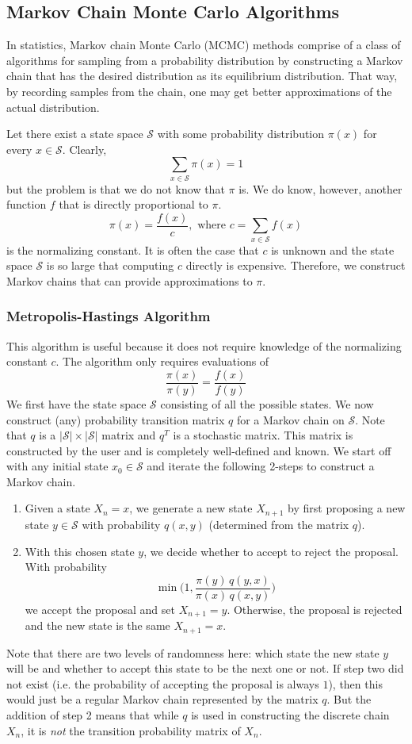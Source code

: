 \documentclass{article}
\theoremstyle{remark}
\theoremstyle{definition}
\begin{document}
\subsection{Markov Chain Monte Carlo Algorithms}
In statistics, Markov chain Monte Carlo (MCMC) methods comprise of a class of algorithms for sampling from a probability distribution by constructing a Markov chain that has the desired distribution as its equilibrium distribution. That way, by recording samples from the chain, one may get better approximations of the actual distribution. 

Let there exist a state space $\mathcal{S}$ with some probability distribution $\pi(x)$ for every $x \in \mathcal{S}$. Clearly, 
\[\sum_{x \in \mathcal{S}} \pi(x) = 1\]
but the problem is that we do not know that $\pi$ is. We do know, however, another function $f$ that is directly proportional to $\pi$. 
\[\pi(x) = \frac{f(x)}{c}, \text{ where } c = \sum_{x \in \mathcal{S}} f(x)\]
is the normalizing constant. It is often the case that $c$ is unknown and the state space $\mathcal{S}$ is so large that computing $c$ directly is expensive. Therefore, we construct Markov chains that can provide approximations to $\pi$. 

\subsubsection{Metropolis-Hastings Algorithm}
This algorithm is useful because it does not require knowledge of the normalizing constant $c$. The algorithm only requires evaluations of 
\[\frac{\pi(x)}{\pi(y)} = \frac{f(x)}{f(y)}\]
We first have the state space $\mathcal{S}$ consisting of all the possible states. We now construct (any) probability transition matrix $q$ for a Markov chain on $\mathcal{S}$. Note that $q$ is a $|\mathcal{S}| \times |\mathcal{S}|$ matrix and $q^T$ is a stochastic matrix. This matrix is constructed by the user and is completely well-defined and known. We start off with any initial state $x_0 \in \mathcal{S}$ and iterate the following 2-steps to construct a Markov chain. 
\begin{enumerate}
    \item Given a state $X_n = x$, we generate a new state $X_{n+1}$ by first proposing a new state $y \in \mathcal{S}$ with probability $q(x, y)$ (determined from the matrix $q$). 
    \item With this chosen state $y$, we decide whether to accept to reject the proposal. With probability 
    \[\min \bigg( 1, \frac{\pi(y) \,  q(y, x)}{\pi(x) \, q(x, y)} \bigg)\]
    we accept the proposal and set $X_{n+1} = y$. Otherwise, the proposal is rejected and the new state is the same $X_{n+1} = x$. 
\end{enumerate}
Note that there are two levels of randomness here: which state the new state $y$ will be and whether to accept this state to be the next one or not. If step two did not exist (i.e. the probability of accepting the proposal is always $1$), then this would just be a regular Markov chain represented by the matrix $q$. But the addition of step 2 means that while $q$ is used in constructing the discrete chain $X_n$, it is \textit{not} the transition probability matrix of $X_n$. 
\end{document}
